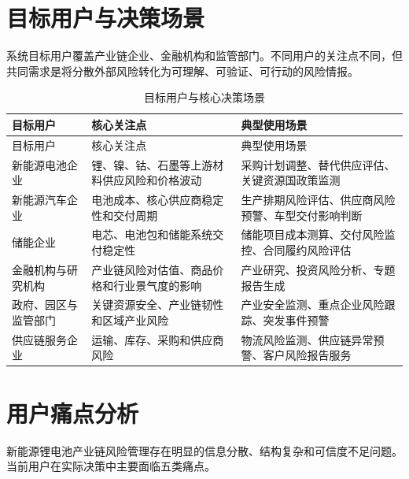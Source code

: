 \documentclass[12pt,a4paper]{ctexart}
\begin{document}
\section{目标用户与决策场景}

系统目标用户覆盖产业链企业、金融机构和监管部门。不同用户的关注点不同，但共同需求是将分散外部风险转化为可理解、可验证、可行动的风险情报。

\begin{longtable}{p{3.0cm}p{4.6cm}p{6.0cm}}
\caption{目标用户与核心决策场景}\label{tab:users}\\
\toprule
目标用户 & 核心关注点 & 典型使用场景 \\
\midrule
\endfirsthead
\toprule
目标用户 & 核心关注点 & 典型使用场景 \\
\midrule
\endhead
新能源电池企业 & 锂、镍、钴、石墨等上游材料供应风险和价格波动 & 采购计划调整、替代供应评估、关键资源国政策监测 \\
新能源汽车企业 & 电池成本、核心供应商稳定性和交付周期 & 生产排期风险评估、供应商风险预警、车型交付影响判断 \\
储能企业 & 电芯、电池包和储能系统交付稳定性 & 储能项目成本测算、交付风险监控、合同履约风险评估 \\
金融机构与研究机构 & 产业链风险对估值、商品价格和行业景气度的影响 & 产业研究、投资风险分析、专题报告生成 \\
政府、园区与监管部门 & 关键资源安全、产业链韧性和区域产业风险 & 产业安全监测、重点企业风险跟踪、突发事件预警 \\
供应链服务企业 & 运输、库存、采购和供应商风险 & 物流风险监测、供应链异常预警、客户风险报告服务 \\
\bottomrule
\end{longtable}

\section{用户痛点分析}

新能源锂电池产业链风险管理存在明显的信息分散、结构复杂和可信度不足问题。当前用户在实际决策中主要面临五类痛点。
\end{document}
